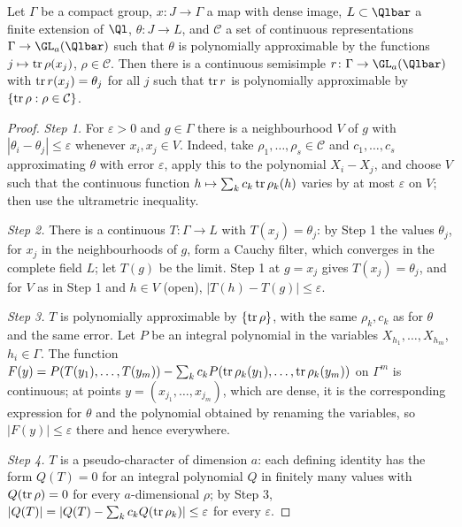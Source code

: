 \begin{theorem}\label{pf:galred:limrep}
Let $\Gamma$ be a compact group, $x\colon J\to\Gamma$ a map with dense image, $L\subset\Qlbar$ a finite extension of $\Ql$,
$\theta\colon J\to L$, and $\mathcal C$ a set of continuous representations $\Gamma\to\GL_a(\Qlbar)$ such that $\theta$ is
polynomially approximable by the functions $j\mapsto\operatorname{tr}\rho(x_j)$, $\rho\in\mathcal C$. Then there is a continuous
semisimple $r\colon\Gamma\to\GL_a(\Qlbar)$ with $\operatorname{tr} r(x_j)=\theta_j$ for all $j$ such that $\operatorname{tr} r$ is polynomially
approximable by $\{\operatorname{tr}\rho:\rho\in\mathcal C\}$.
\end{theorem}

\begin{proof}
\emph{Step 1.} For $\varepsilon>0$ and $g\in\Gamma$ there is a neighbourhood $V$ of $g$ with $|\theta_i-\theta_j|\le\varepsilon$
whenever $x_i,x_j\in V$. Indeed, take $\rho_1,\dots,\rho_s\in\mathcal C$ and $c_1,\dots,c_s$ approximating $\theta$ with error
$\varepsilon$, apply this to the polynomial $X_i-X_j$, and choose $V$ such that the continuous function $h\mapsto\sum_k
c_k\operatorname{tr}\rho_k(h)$ varies by at most $\varepsilon$ on $V$; then use the ultrametric inequality.

\emph{Step 2.} There is a continuous $T\colon\Gamma\to L$ with $T(x_j)=\theta_j$: by Step 1 the values $\theta_j$, for $x_j$
in the neighbourhoods of $g$, form a Cauchy filter, which converges in the complete field $L$; let $T(g)$ be the limit.
Step 1 at $g=x_j$ gives $T(x_j)=\theta_j$, and for $V$ as in Step 1 and $h\in V$ (open), $|T(h)-T(g)|\le\varepsilon$.

\emph{Step 3.} $T$ is polynomially approximable by $\{\operatorname{tr}\rho\}$, with the same $\rho_k,c_k$ as for $\theta$ and the same
error. Let $P$ be an integral polynomial in the variables $X_{h_1},\dots,X_{h_m}$, $h_i\in\Gamma$. The function
$F(y)=P(T(y_1),\dots,T(y_m))-\sum_kc_kP(\operatorname{tr}\rho_k(y_1),\dots,\operatorname{tr}\rho_k(y_m))$ on $\Gamma^m$ is continuous; at points
$y=(x_{j_1},\dots,x_{j_m})$, which are dense, it is the corresponding expression for $\theta$ and the polynomial obtained by
renaming the variables, so $|F(y)|\le\varepsilon$ there and hence everywhere.

\emph{Step 4.} $T$ is a pseudo-character of dimension $a$: each defining identity has the form $Q(T)=0$ for an integral
polynomial $Q$ in finitely many values with $Q(\operatorname{tr}\rho)=0$ for every $a$-dimensional $\rho$; by Step 3,
$|Q(T)|=|Q(T)-\sum_kc_kQ(\operatorname{tr}\rho_k)|\le\varepsilon$ for every $\varepsilon$.


\end{proof}
